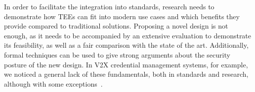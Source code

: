 In order to facilitate the integration into standards, research needs to
demonstrate how \acp{TEE} can fit into modern use cases and which benefits they
provide compared to traditional solutions. Proposing a novel design is not
enough, as it needs to be accompanied by an extensive evaluation to demonstrate
its feasibility, as well as a fair comparison with the state of the art.
Additionally, formal techniques can be used to give strong arguments about the
security posture of the new design. In \ac{V2X} credential management systems,
for example, we noticed a general lack of these fundamentals, both in standards
and research, although with some exceptions~\cite{whitefield2017formal}.
